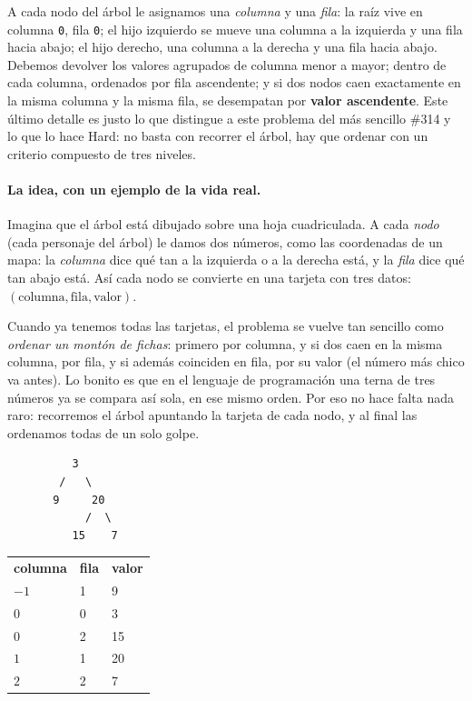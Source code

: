 
A cada nodo del árbol le asignamos una \emph{columna} y una \emph{fila}: la
raíz vive en columna \texttt{0}, fila \texttt{0}; el hijo izquierdo se mueve
una columna a la izquierda y una fila hacia abajo; el hijo derecho, una
columna a la derecha y una fila hacia abajo. Debemos devolver los valores
agrupados de columna menor a mayor; dentro de cada columna, ordenados por
fila ascendente; y si dos nodos caen exactamente en la misma columna y la
misma fila, se desempatan por \textbf{valor ascendente}. Este último detalle
es justo lo que distingue a este problema del más sencillo \#314 y lo que lo
hace Hard: no basta con recorrer el árbol, hay que ordenar con un criterio
compuesto de tres niveles.

\paragraph{La idea, con un ejemplo de la vida real.} Imagina que el árbol está
dibujado sobre una hoja cuadriculada. A cada \emph{nodo} (cada personaje del
árbol) le damos dos números, como las coordenadas de un mapa: la \emph{columna}
dice qué tan a la izquierda o a la derecha está, y la \emph{fila} dice qué tan
abajo está. Así cada nodo se convierte en una tarjeta con tres datos:
$(\text{columna}, \text{fila}, \text{valor})$.

Cuando ya tenemos todas las tarjetas, el problema se vuelve tan sencillo como
\emph{ordenar un montón de fichas}: primero por columna, y si dos caen en la
misma columna, por fila, y si además coinciden en fila, por su valor (el número
más chico va antes). Lo bonito es que en el lenguaje de programación una terna de
tres números ya se compara así sola, en ese mismo orden. Por eso no hace falta
nada raro: recorremos el árbol apuntando la tarjeta de cada nodo, y al final las
ordenamos todas de un solo golpe.

\begin{center}
\begin{verbatim}
          3
        /   \
       9     20
            /  \
          15    7
\end{verbatim}
\end{center}

\begin{center}
\begin{tabular}{lll}
\textbf{columna} & \textbf{fila} & \textbf{valor} \\
$-1$ & 1 & 9 \\
$0$  & 0 & 3 \\
$0$  & 2 & 15 \\
$1$  & 1 & 20 \\
$2$  & 2 & 7 \\
\end{tabular}
\end{center}

